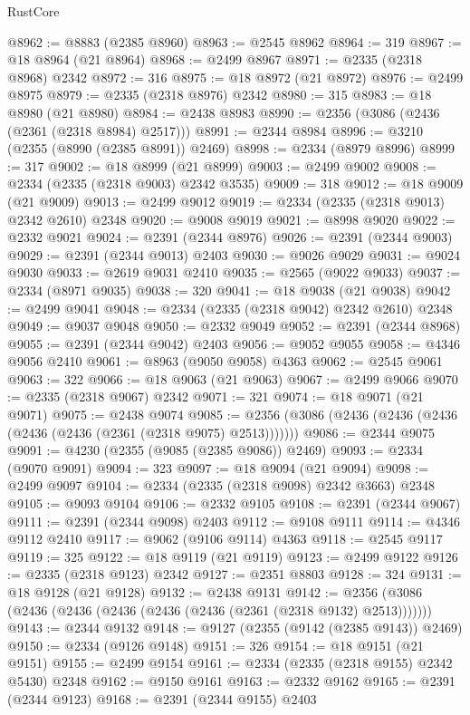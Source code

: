\begin{lexlean}{RustCore}
\begin{coremodule}
@8962 := @8883 (@2385 @8960)
@8963 := @2545 @8962
@8964 := 319
@8967 := @18 @8964 (@21 @8964)
@8968 := @2499 @8967
@8971 := @2335 (@2318 @8968) @2342
@8972 := 316
@8975 := @18 @8972 (@21 @8972)
@8976 := @2499 @8975
@8979 := @2335 (@2318 @8976) @2342
@8980 := 315
@8983 := @18 @8980 (@21 @8980)
@8984 := @2438 @8983
@8990 := @2356 (@3086 (@2436 (@2361 (@2318 @8984) @2517)))
@8991 := @2344 @8984
@8996 := @3210 (@2355 (@8990 (@2385 @8991)) @2469)
@8998 := @2334 (@8979 @8996)
@8999 := 317
@9002 := @18 @8999 (@21 @8999)
@9003 := @2499 @9002
@9008 := @2334 (@2335 (@2318 @9003) @2342 @3535)
@9009 := 318
@9012 := @18 @9009 (@21 @9009)
@9013 := @2499 @9012
@9019 := @2334 (@2335 (@2318 @9013) @2342 @2610) @2348
@9020 := @9008 @9019
@9021 := @8998 @9020
@9022 := @2332 @9021
@9024 := @2391 (@2344 @8976)
@9026 := @2391 (@2344 @9003)
@9029 := @2391 (@2344 @9013) @2403
@9030 := @9026 @9029
@9031 := @9024 @9030
@9033 := @2619 @9031 @2410
@9035 := @2565 (@9022 @9033)
@9037 := @2334 (@8971 @9035)
@9038 := 320
@9041 := @18 @9038 (@21 @9038)
@9042 := @2499 @9041
@9048 := @2334 (@2335 (@2318 @9042) @2342 @2610) @2348
@9049 := @9037 @9048
@9050 := @2332 @9049
@9052 := @2391 (@2344 @8968)
@9055 := @2391 (@2344 @9042) @2403
@9056 := @9052 @9055
@9058 := @4346 @9056 @2410
@9061 := @8963 (@9050 @9058) @4363
@9062 := @2545 @9061
@9063 := 322
@9066 := @18 @9063 (@21 @9063)
@9067 := @2499 @9066
@9070 := @2335 (@2318 @9067) @2342
@9071 := 321
@9074 := @18 @9071 (@21 @9071)
@9075 := @2438 @9074
@9085 := @2356 (@3086 (@2436 (@2436 (@2436 (@2436 (@2436 (@2361 (@2318 @9075) @2513)))))))
@9086 := @2344 @9075
@9091 := @4230 (@2355 (@9085 (@2385 @9086)) @2469)
@9093 := @2334 (@9070 @9091)
@9094 := 323
@9097 := @18 @9094 (@21 @9094)
@9098 := @2499 @9097
@9104 := @2334 (@2335 (@2318 @9098) @2342 @3663) @2348
@9105 := @9093 @9104
@9106 := @2332 @9105
@9108 := @2391 (@2344 @9067)
@9111 := @2391 (@2344 @9098) @2403
@9112 := @9108 @9111
@9114 := @4346 @9112 @2410
@9117 := @9062 (@9106 @9114) @4363
@9118 := @2545 @9117
@9119 := 325
@9122 := @18 @9119 (@21 @9119)
@9123 := @2499 @9122
@9126 := @2335 (@2318 @9123) @2342
@9127 := @2351 @8803
@9128 := 324
@9131 := @18 @9128 (@21 @9128)
@9132 := @2438 @9131
@9142 := @2356 (@3086 (@2436 (@2436 (@2436 (@2436 (@2436 (@2361 (@2318 @9132) @2513)))))))
@9143 := @2344 @9132
@9148 := @9127 (@2355 (@9142 (@2385 @9143)) @2469)
@9150 := @2334 (@9126 @9148)
@9151 := 326
@9154 := @18 @9151 (@21 @9151)
@9155 := @2499 @9154
@9161 := @2334 (@2335 (@2318 @9155) @2342 @5430) @2348
@9162 := @9150 @9161
@9163 := @2332 @9162
@9165 := @2391 (@2344 @9123)
@9168 := @2391 (@2344 @9155) @2403

\end{coremodule}
\end{lexlean}

